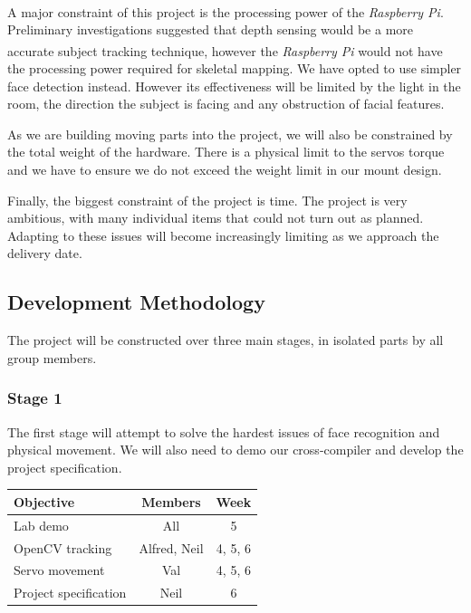 \documentclass[11pt,a4paper,titlepage]{report}
\newcommand{\rpi}{\textit{Raspberry Pi\textsuperscript{\textregistered}}}
\begin{document}
A major constraint of this project is the processing power of the \rpi. Preliminary investigations suggested that depth sensing would be a more accurate subject tracking technique, however the \rpi\xspace would not have the processing power required for skeletal mapping. We have opted to use simpler face detection instead. However its effectiveness will be limited by the light in the room, the direction the subject is facing and any obstruction of facial features.

As we are building moving parts into the project, we will also be constrained by the total weight of the hardware. There is a physical limit to the servos torque and we have to ensure we do not exceed the weight limit in our mount design.

Finally, the biggest constraint of the project is time. The project is very ambitious, with many individual items that could not turn out as planned. Adapting to these issues will become increasingly limiting as we approach the delivery date.


\subsection{Development Methodology}

The project will be constructed over three main stages, in isolated parts by all group members. 


\subsubsection{Stage 1}

The first stage will attempt to solve the hardest issues of face recognition and physical movement. We will also need to demo our cross-compiler and develop the project specification.

\begin{table}[H]
\begin{tabular}{|l|c|c|}
    \hline
    \textbf{Objective} & \textbf{Members} & \textbf{Week} \\ \hline
    
    Lab demo & All & 5 \\ \hline
    OpenCV tracking & Alfred, Neil & 4, 5, 6 \\ \hline
    Servo movement & Val & 4, 5, 6 \\ \hline
    Project specification & Neil & 6 \\ \hline

\end{tabular}
\end{table}
\end{document}
